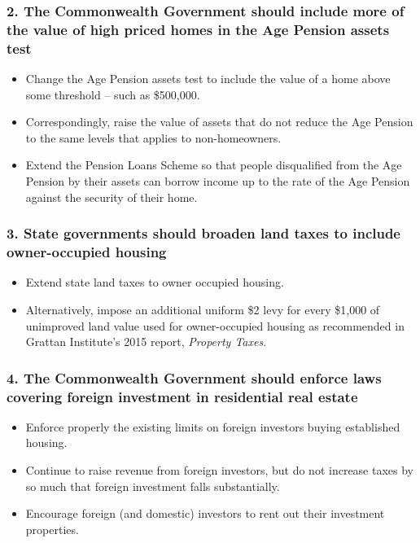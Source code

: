 \documentclass[FrontPage]{grattan}
\begin{document}
\subsubsection{2. The Commonwealth Government should include more of the value of high priced homes in the Age Pension assets test}
\begin{itemize}
\item Change the Age Pension assets test to include the value of a home above some threshold – such as \$500,000.
\item Correspondingly, raise the value of assets that do not reduce the Age Pension to the same levels that applies to non-homeowners.
\item Extend the Pension Loans Scheme so that people disqualified from the Age Pension by their assets can borrow income up to the rate of the Age Pension against the security of their home. 
\end{itemize}
\vfill\null
\eject
\null
\vspace*{-0.6\baselineskip}
\subsubsection{3. State governments should broaden land taxes to include owner-occupied housing}
\begin{itemize}
\item Extend state land taxes to owner occupied housing.
\item Alternatively, impose an additional uniform \$2 levy for every \$1,000 of unimproved land value used for owner-occupied housing as recommended in Grattan Institute's 2015 report, \textit{Property Taxes}. 
\end{itemize}

\subsubsection{4. The Commonwealth Government should enforce laws covering foreign investment in residential real estate}
\begin{itemize}
\item Enforce properly the existing limits on foreign investors buying established housing.  
\item Continue to raise revenue from foreign investors, but do not increase taxes by so much that foreign investment falls substantially.
\item Encourage foreign (and domestic) investors to rent out their investment properties.
\end{itemize}
\end{document}
